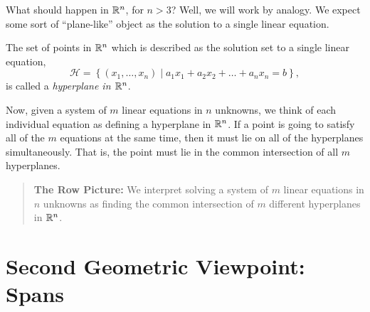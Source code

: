 \documentclass[00-livre-main.tex]{subfiles}
\begin{document}
What should happen in $\mathbb{R}^n$, for $n>3$? Well, we will work by analogy. We expect some sort of ``plane-like'' object as the solution to a single linear equation.

\begin{definition}
The set of points in $\mathbb{R}^n$ which is described as the solution set to a single linear equation,
\[
\mathcal{H} = \left\{ (x_1,\ldots, x_n) \middle| a_1x_1 + a_2 x_2 + \dots + a_n x_n = b \right\} ,
\]
is called a \emph{hyperplane in $\mathbb{R}^n$}.
\end{definition}

Now, given a system of $m$ linear equations in $n$ unknowns, we think of each individual equation as defining a hyperplane in $\mathbb{R}^n$. If a point is going to satisfy all of the $m$ equations at the same time, then it must lie on all of the hyperplanes simultaneously. That is, the point must lie in the common intersection of all $m$ hyperplanes.

\begin{quote}
\textbf{The Row Picture:} We interpret solving a system of $m$ linear equations in $n$ unknowns as finding the common intersection of $m$ different hyperplanes in $\mathbb{R}^n$.
\end{quote}

\section*{Second Geometric Viewpoint: Spans}
\end{document}

